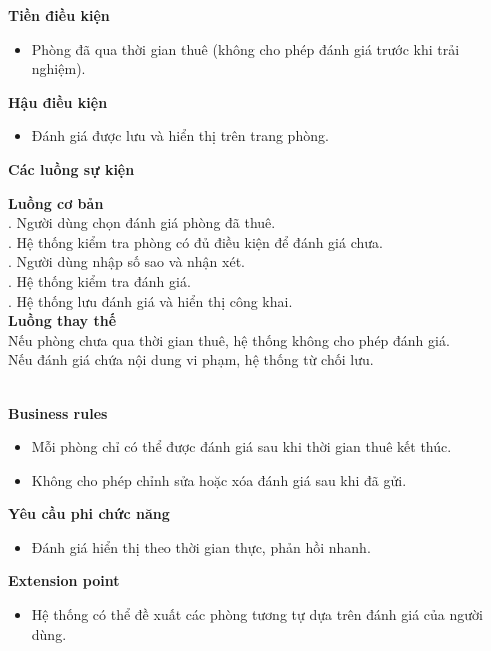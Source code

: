 \textbf{Tiền điều kiện}
\begin{itemize}
    \item Phòng đã qua thời gian thuê (không cho phép đánh giá trước khi trải nghiệm).
\end{itemize}

\textbf{Hậu điều kiện}
\begin{itemize}
    \item Đánh giá được lưu và hiển thị trên trang phòng.
\end{itemize}

\textbf{Các luồng sự kiện}

\begin{small}
\textbf{Luồng cơ bản}\\
. Người dùng chọn đánh giá phòng đã thuê.\\
. Hệ thống kiểm tra phòng có đủ điều kiện để đánh giá chưa.\\
. Người dùng nhập số sao và nhận xét.\\
. Hệ thống kiểm tra đánh giá.\\
. Hệ thống lưu đánh giá và hiển thị công khai.\\

\textbf{Luồng thay thế}\\
 Nếu phòng chưa qua thời gian thuê, hệ thống không cho phép đánh giá.\\
 Nếu đánh giá chứa nội dung vi phạm, hệ thống từ chối lưu.\\
\end{small}\\
\textbf{\indent Business rules}
\begin{itemize}
    \item Mỗi phòng chỉ có thể được đánh giá sau khi thời gian thuê kết thúc.
    \item Không cho phép chỉnh sửa hoặc xóa đánh giá sau khi đã gửi.
\end{itemize}

\textbf{Yêu cầu phi chức năng}
\begin{itemize}
    \item Đánh giá hiển thị theo thời gian thực, phản hồi nhanh.
\end{itemize}

\textbf{Extension point}
\begin{itemize}
    \item Hệ thống có thể đề xuất các phòng tương tự dựa trên đánh giá của người dùng.
\end{itemize}



